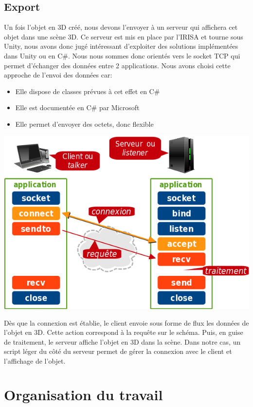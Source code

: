 \documentclass[a4paper,11pt]{article}
\begin{document}
		\subsection{Export} %
			Un fois l'objet en 3D créé, nous devons l'envoyer à un serveur qui affichera cet objet dans une scène 3D.
			Ce serveur est mis en place par l'IRISA et tourne sous Unity, nous avons donc jugé intéressant d'exploiter des solutions implémentées dans Unity ou en C\#.
			Nous nous sommes donc orientés vers le socket TCP qui permet d'échanger des données entre 2 applications.
			Nous avons choisi cette approche de l'envoi des données car:
			\begin{itemize}
				\item Elle dispose de classes prévues à cet effet en C\#
				\item Elle est documentée en C\# par Microsoft
				\item Elle permet d'envoyer des octets, donc flexible
			\end{itemize}
						
			
			\centerline{\includegraphics[scale=1]{images/tcp-socket.png}}
			
			Dès que la connexion est établie, le client envoie sous forme de flux les données de l'objet en 3D. Cette action correspond à la requête sur le schéma. Puis, en guise de traitement, le serveur affiche l'objet en 3D dans la scène.
			Dans notre cas, un script léger du côté du serveur permet de gérer la connexion avec le client et l'affichage de l'objet.
			
	\section{Organisation du travail}
				
\end{document}
